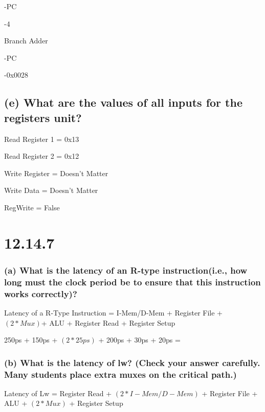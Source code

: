 \documentclass{article}
\begin{document}
    \hspace{0.2in} -PC

    \hspace{0.2in} -4

    Branch Adder

    \hspace{0.2in} -PC

    \hspace{0.2in} -0x0028
    
    \subsection*{(e) What are the values of all inputs for the registers unit?}

    Read Register 1 = 0x13

    Read Register 2 = 0x12

    Write Register = Doesn’t Matter

    Write Data = Doesn’t Matter

    RegWrite = False

    \newpage

    \section*{12.14.7}

    \subsubsection*{(a) What is the latency of an R-type instruction(i.e., how
    long must the clock period be to ensure that this instruction works correctly)?}

    \noindent Latency of a R-Type Instruction = I-Mem/D-Mem + Register File + $(2 * Mux)$+ ALU + Register Read + Register
    Setup 

    \vspace*{0.1in}

    250ps + 150ps + $(2 * 25ps)$ + 200ps + 30ps + 20ps = 

    \subsubsection*{(b) What is the latency of lw? (Check your answer carefully. Many students place extra muxes on the critical
    path.)}

    \noindent Latency of Lw = Register Read + $(2 * I-Mem/D-Mem)$ + Register File + ALU + $(2 * Mux)$ + Register Setup
\end{document}

